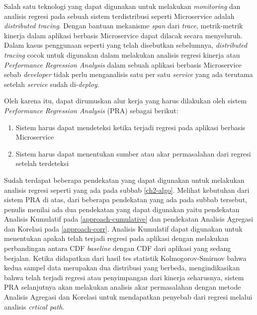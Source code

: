 Salah satu teknologi yang dapat digunakan untuk melakukan \textit{monitoring} dan analisis regresi pada sebuah sistem terdistribusi seperti Microservice adalah \textit{distributed tracing}. Dengan bantuan mekanisme \textit{span} dari \textit{trace}, metrik-metrik kinerja dalam aplikasi berbasis Microservice dapat dilacak secara menyeluruh. Dalam kasus penggunaan seperti yang telah disebutkan sebelumnya, \textit{distributed tracing} cocok untuk digunakan dalam melakukan analisis regresi kinerja atau \textit{Performance Regression Analysis} dalam sebuah aplikasi berbasis Microservice sebab \textit{developer} tidak perlu menganalisis satu per satu \textit{service} yang ada terutama setelah \textit{service} sudah di-\textit{deploy}.

Oleh karena itu, dapat dirumuskan alur kerja yang harus dilakukan oleh sistem \textit{Performance Regression Analysis} (PRA) sebagai berikut:
\begin{enumerate}
	\item Sistem harus dapat mendeteksi ketika terjadi regresi pada aplikasi berbasis Microservice
	\item Sistem harus dapat menentukan sumber atau akar permasalahan dari regresi setelah terdeteksi
\end{enumerate}

Sudah terdapat beberapa pendekatan yang dapat digunakan untuk melakukan analisis regresi seperti yang ada pada subbab \ref{ch2-algo}. Melihat kebutuhan dari sistem PRA di atas, dari beberapa pendekatan yang ada pada subbab tersebut, penulis menilai ada dua pendekatan yang dapat digunakan yaitu pendekatan Analisis Kumulatif pada \ref{approach-cumulative} dan pendekatan Analisis Agregasi dan Korelasi pada \ref{approach-corr}. Analisis Kumulatif dapat digunakan untuk menentukan apakah telah terjadi regresi pada aplikasi dengan melakukan perbandingan antara CDF \textit{baseline} dengan CDF dari aplikasi yang sedang berjalan. Ketika didapatkan dari hasil tes statistik Kolmogorov-Smirnov bahwa kedua sampel data merupakan dua distribusi yang berbeda, mengindikasikan bahwa telah terjadi regresi atau penyimpangan dari kinerja seharusnya, sistem PRA selanjutnya akan melakukan analisis akar permasalahan dengan metode Analisis Agregasi dan Korelasi untuk mendapatkan penyebab dari regresi melalui analisis \textit{crtical path}.

